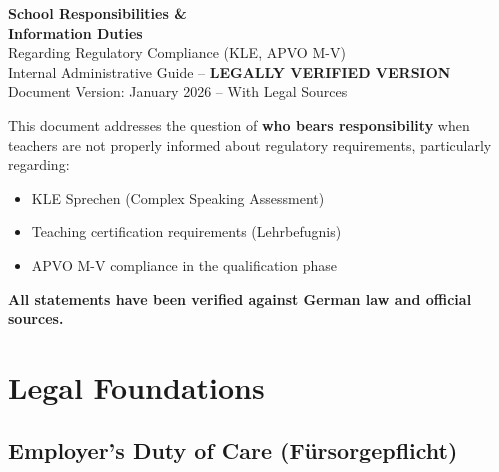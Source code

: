 \documentclass[11pt,a4paper]{article}
\begin{document}
\begin{center}
    {\LARGE\bfseries\color{primaryblue} School Responsibilities \&\\[0.3em] Information Duties}\\[1em]
    {\large Regarding Regulatory Compliance (KLE, APVO M-V)}\\[0.5em]
    {\normalsize Internal Administrative Guide -- \textbf{LEGALLY VERIFIED VERSION}}\\[2em]
    {\small Document Version: January 2026 -- With Legal Sources}
\end{center}

\vspace{1em}

\begin{warningbox}
This document addresses the question of \textbf{who bears responsibility} when teachers are not properly informed about regulatory requirements, particularly regarding:
\begin{itemize}[nosep]
    \item KLE Sprechen (Complex Speaking Assessment)
    \item Teaching certification requirements (Lehrbefugnis)
    \item APVO M-V compliance in the qualification phase
\end{itemize}
\textbf{All statements have been verified against German law and official sources.}
\end{warningbox}

\vspace{1em}

\section{Legal Foundations}

\subsection{Employer's Duty of Care (Fürsorgepflicht)}
\end{document}
